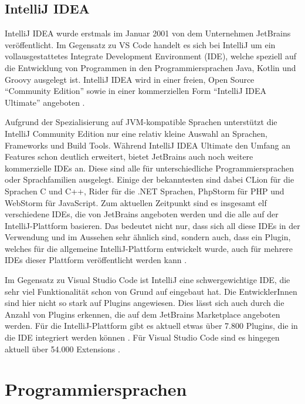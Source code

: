 \subsection{IntelliJ IDEA}

IntelliJ IDEA wurde erstmals im Januar 2001 \cite{IntelliJReleasePage}
von dem Unternehmen 
JetBrains veröffentlicht. Im Gegensatz zu VS Code handelt 
es sich bei IntelliJ um ein vollausgestattetes Integrate Development Environment (IDE),
welche speziell auf die Entwicklung 
von Programmen in den Programmiersprachen Java, Kotlin und Groovy ausgelegt ist. 
IntelliJ IDEA wird in einer freien, Open Source 
\enquote{Community Edition} \cite{IntelliJCommunityEditionGithub} sowie in einer kommerziellen Form 
\enquote{IntelliJ IDEA Ultimate} angeboten \cite{HagosTed2022BII:}. 

Aufgrund der Spezialisierung auf JVM-kompatible Sprachen unterstützt 
die IntelliJ Community Edition nur eine relativ kleine Auswahl an 
Sprachen, Frameworks und Build Tools. Während IntelliJ IDEA Ultimate 
den Umfang an Features schon deutlich erweitert, bietet JetBrains auch 
noch weitere kommerzielle IDEs an. Diese sind alle für unterschiedliche 
Programmiersprachen oder Sprachfamilien ausgelegt. Einige der bekanntesten 
sind dabei CLion für die Sprachen C und C++, Rider für die .NET Sprachen, 
PhpStorm für PHP und WebStorm für JavaScript. Zum aktuellen 
Zeitpunkt sind es insgesamt elf verschiedene IDEs, die von JetBrains 
angeboten werden und die alle auf der IntelliJ-Plattform basieren. Das 
bedeutet nicht nur, dass sich all diese IDEs in der Verwendung und im 
Aussehen sehr ähnlich sind, sondern auch, dass ein Plugin, welches für 
die allgemeine IntelliJ-Plattform entwickelt wurde, 
auch für mehrere IDEs dieser Plattform veröffentlicht werden kann \cite{IntelliJSDKDocumentation}.

Im Gegensatz zu Visual Studio Code ist IntelliJ eine schwergewichtige
IDE, die sehr viel Funktionalität schon von Grund auf eingebaut 
hat. Die EntwicklerInnen sind hier nicht so stark auf Plugins angewiesen.
Dies lässt sich auch durch die Anzahl von Plugins erkennen, die auf dem 
JetBrains Marketplace angeboten werden. Für die IntelliJ-Plattform gibt 
es aktuell etwas über 7.800 Plugins, die in die IDE integriert werden können 
\cite{IntelliJMarketplace}.
Für Visual Studio Code sind es hingegen aktuell über 54.000 Extensions
\cite{VSCodeMarketplace}.


\section{Programmiersprachen}
\label{sec:Programmiersprachen}

